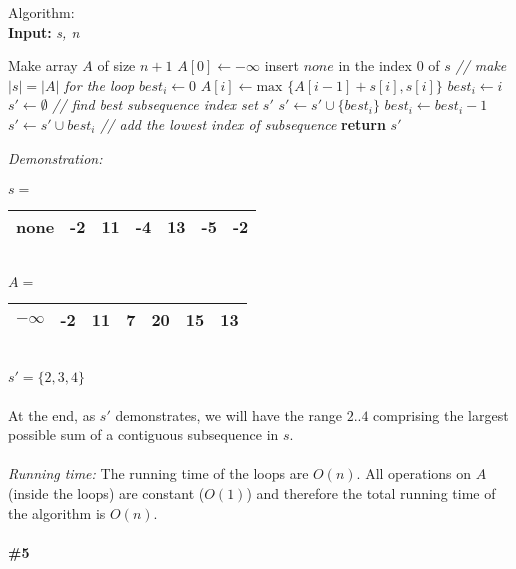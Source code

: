 \documentclass{article}
\begin{document}
Algorithm:\\
\textbf{Input:} \textit{s, n}
\begin{algorithmic}
\State Make array $A$ of size $n + 1$
\State $A[0] \gets -\infty$
\State insert $none$ in the index $0$ of $s$ \textit{// make $|s| = |A|$ for the loop}
\State $best_i \gets 0$
  \State $A[i] \gets \text{max } \{A[i-1]+s[i], s[i] \}$
    \State $best_i \gets i$
  \EndIf
\EndFor
\State $s' \gets \emptyset$ \textit{ // find best subsequence index set $s'$}
  \State $s' \gets s' \cup \{ best_i \}$
  \State $best_i \gets best_i - 1$
\EndWhile
\State $s' \gets s' \cup best_i$ \textit{// add the lowest index of subsequence}
\State \textbf{return} $s'$\\
\end{algorithmic}
\textit{Demonstration:}
\\\\
$s = $
\begin{tabular}{ |c|c|c|c|c|c|c| } 
 \hline
 none & -2 & 11 & -4 & 13 & -5 & -2 \\
 \hline
\end{tabular}
\\
$A = $
\begin{tabular}{ |c|c|c|c|c|c|c| } 
 \hline
 $-\infty$ & -2 & 11 & 7 & \textbf{20} & 15 & 13 \\
 \hline
\end{tabular}
\\
$s' = \{ 2, 3, 4\}$
\\
\\
At the end, as $s'$ demonstrates, we will have the range $2..4$ comprising the largest possible sum of a contiguous subsequence in $s$.
\\
\\
\textit{Running time:} The running time of the loops are $O(n)$. All operations on $A$ (inside the loops) are constant ($O(1)$) and therefore the total running time of the algorithm is $O(n)$.\\\\
\textbf{\#5}
\\
\\
\end{document}
